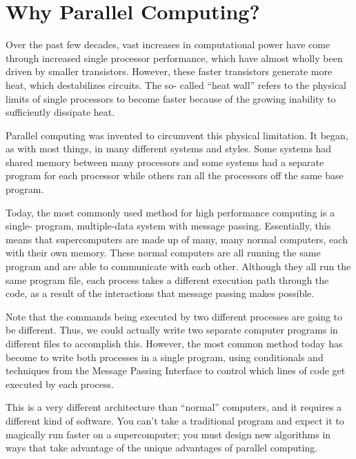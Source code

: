 \label{lab:MPI_Intro}

\section*{Why Parallel Computing?}
Over the past few decades, vast increases in computational power have come
through increased single processor performance, which have almost wholly been
driven by smaller transistors. However, these faster transistors generate more
heat, which destabilizes circuits. The so- called ``heat wall'' refers to the
physical limits of single processors to become faster because of the growing
inability to sufficiently dissipate heat.

Parallel computing was invented to circumvent this physical limitation. It
began, as with most things, in many different systems and styles. Some systems
had shared memory between many processors and some systems had a separate
program for each processor while others ran all the processors off the same base
program.

Today, the most commonly used method for high performance computing is a single-
program, multiple-data system with message passing. Essentially, this means that
supercomputers are made up of many, many normal computers, each with their own
memory. These normal computers are all running the same program and are able to
communicate with each other. Although they all run the same program file, each
process takes a different execution path through the code, as a result of the
interactions that message passing makes possible.

Note that the commands being executed by two different processes are going to be
different. Thus, we could actually write two separate computer programs in
different files to accomplish this. However, the most common method today has
become to write both processes in a single program, using conditionals and
techniques from the Message Passing Interface to control which lines of code get
executed by each process.

This is a very different architecture than ``normal'' computers, and it requires
a different kind of software. You can't take a traditional program and expect it
to magically run faster on a supercomputer; you must design new algorithms in
ways that take advantage of the unique advantages of parallel computing.

